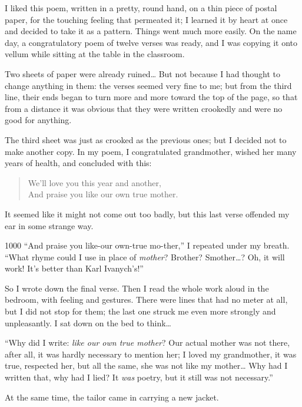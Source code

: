 I liked this poem, written in a pretty, round hand, on a thin piece of postal paper, for the touching feeling that permeated it; I learned it by heart at once and decided to take it as a pattern. Things went much more easily. On the name day, a congratulatory poem of twelve verses was ready, and I was copying it onto vellum while sitting at the table in the classroom.

Two sheets of paper were already ruined\ldots{} But not because I had thought to change anything in them: the verses seemed very fine to me; but from the third line, their ends began to turn more and more toward the top of the page, so that from a distance it was obvious that they were written crookedly and were no good for anything.

The third sheet was just as crooked as the previous ones; but I decided not to make another copy. In my poem, I congratulated grandmother, wished her many years of health, and concluded with this:

\begin{verse}
We'll love you this year and another,\\
And praise you like our own true mother.
\end{verse}

It seemed like it might not come out too badly, but this last verse offended my ear in some strange way.

\begin{tolerant}{1000}
``And praise you like-our own-true mo-ther,'' I repeated under my breath. ``What rhyme could I use in place of \emph{mother}? Brother? Smother\ldots{}? Oh, it will work! It's better than Karl Ivanych's!'' %
\end{tolerant}

So I wrote down the final verse. Then I read the whole work aloud in the bedroom, with feeling and gestures. There were lines that had no meter at all, but I did not stop for them; the last one struck me even more strongly and unpleasantly. I sat down on the bed to think\ldots{}

``Why did I write: \textit{like our own true mother}? Our actual mother was not there, after all, it was hardly necessary to mention her; I loved my grandmother, it was true, respected her, but all the same, she was not like my mother\ldots{} Why had I written that, why had I lied? It \emph{was} poetry, but it still was not necessary.'' %

At the same time, the tailor came in carrying a new jacket.

